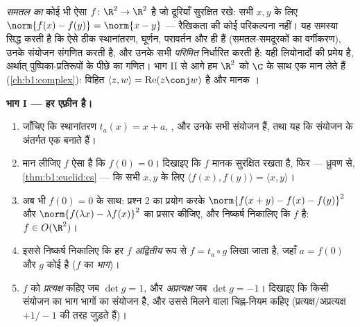 \begin{problem}\label{pb:b1:euclid:1}
\emph{समतल का } कोई भी ऐसा  $f \colon \R^2 \to \R^2$ है जो
दूरियाँ सुरक्षित रखे: सभी $x, y$ के लिए $\norm{f(x) - f(y)} = \norm{x - y}$
--- रैखिकता की कोई परिकल्पना नहीं। यह समस्या सिद्ध करती है कि ऐसे
 ठीक स्थानांतरण, घूर्णन, परावर्तन और  ही हैं
(समतल-समदूरकों का वर्गीकरण), उनके संयोजन संगणित करती है, और उनके सभी
\emph{परिमित}  निर्धारित करती है: यही लियोनार्दो की प्रमेय है, अर्थात्
पुष्पिका-प्रतिरूपों के पीछे का गणित। भाग II से आगे हम $\R^2$ को $\C$ के साथ
एक मान लेते हैं (\cref{ch:b1:complex}): विहित  $\langle z, w\rangle
= \operatorname{Re}(z\conj w)$ है और मानक । 

\medskip \noindent\textbf{भाग I --- हर  एफ़ीन है।}
\begin{enumerate}
  \item जाँचिए कि स्थानांतरण $t_a(x) = x + a$,  , और उनके सभी
  संयोजन  हैं, तथा यह कि  संयोजन के अंतर्गत एक  बनाते हैं।
  \item मान लीजिए $f$ ऐसा  है कि $f(0) = 0$। दिखाइए कि $f$ मानक
  सुरक्षित रखता है, फिर --- ध्रुवण से, \cref{thm:b1:euclid:cs} --- कि सभी
  $x, y$ के लिए $\langle f(x), f(y)\rangle = \langle x, y\rangle$।
  \item अब भी $f(0) = 0$ के साथ: प्रश्न 2 का प्रयोग करके $\norm{f(x + y) -
  f(x) - f(y)}^2$ और $\norm{f(\lambda x) - \lambda f(x)}^2$ का प्रसार कीजिए,
  और निष्कर्ष निकालिए कि $f$ \emph{} है: $f \in O(\R^2)$।
  \item इससे निष्कर्ष निकालिए कि हर  $f$ \emph{अद्वितीय} रूप से $f =
  t_a \circ g$ लिखा जाता है, जहाँ $a = f(0)$ और $g$ कोई   है ($f$
  का \emph{ भाग})।
  \item $f$ को \emph{प्रत्यक्ष} कहिए जब $\det g = 1$, और \emph{अप्रत्यक्ष}
  जब $\det g = -1$। दिखाइए कि किसी संयोजन का  भाग  भागों का संयोजन
  है, और उससे मिलने वाला चिह्न-नियम कहिए (प्रत्यक्ष/अप्रत्यक्ष $+1/-1$ की
  तरह जुड़ते हैं)।
\end{enumerate}


\end{problem}
